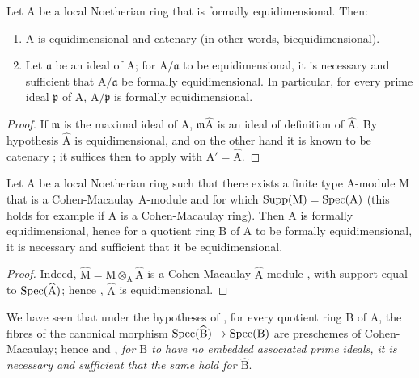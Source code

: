 \begin{corollary}[7.1.4]
\label{IV.7.1.4}
Let $\mathrm{A}$ be a local Noetherian ring that is formally equidimensional.
Then:
\begin{enumerate}[label=\emph{\roman*)}]
  \item $\mathrm{A}$ is equidimensional and catenary \textup{(in other words,} biequidimensional\textup{)}.
  \item Let $\mathfrak{a}$ be an ideal of $\mathrm{A}$; for $\mathrm{A}/\mathfrak{a}$ to be equidimensional, it is necessary and sufficient that $\mathrm{A}/\mathfrak{a}$ be formally equidimensional.
  In particular, for every prime ideal $\mathfrak{p}$ of $\mathrm{A}$, $\mathrm{A}/\mathfrak{p}$ is formally equidimensional.
\end{enumerate}
\end{corollary}

\begin{proof}
If $\mathfrak{m}$ is the maximal ideal of $\mathrm{A}$, $\mathfrak{m}\widehat{\mathrm{A}}$ is an ideal of definition of $\widehat{\mathrm{A}}$.
By hypothesis $\widehat{\mathrm{A}}$ is equidimensional, and on the other hand it is known to be catenary ; it suffices then to apply  with $\mathrm{A}'=\widehat{\mathrm{A}}$.
\end{proof}

\begin{corollary}[7.1.5]
\label{IV.7.1.5}
Let $\mathrm{A}$ be a local Noetherian ring such that there exists a finite type $\mathrm{A}$-module $\mathrm{M}$ that is a Cohen-Macaulay $\mathrm{A}$-module and for which $\operatorname{Supp}(\mathrm{M})=\operatorname{Spec}(\mathrm{A})$ \textup{(this holds for example if $\mathrm{A}$ is a Cohen-Macaulay ring)}.
Then $\mathrm{A}$ is formally equidimensional, hence  for a quotient ring $\mathrm{B}$ of $\mathrm{A}$ to be formally equidimensional, it is necessary and sufficient that it be equidimensional.
\end{corollary}

\begin{proof}
Indeed, $\widehat{\mathrm{M}}=\mathrm{M}\otimes_\mathrm{A}\widehat{\mathrm{A}}$ is a Cohen-Macaulay $\widehat{\mathrm{A}}$-module , with support equal to $\operatorname{Spec}(\widehat{\mathrm{A}})$; hence , $\widehat{\mathrm{A}}$ is equidimensional.
\end{proof}

\begin{remark}[7.1.6]
\label{IV.7.1.6}
We have seen  that under the hypotheses of , for every quotient ring $\mathrm{B}$ of $\mathrm{A}$, the fibres of the canonical morphism $\operatorname{Spec}(\widehat{\mathrm{B}})\to\operatorname{Spec}(\mathrm{B})$ are preschemes of Cohen-Macaulay; hence  and , \emph{for $\mathrm{B}$ to have no embedded associated prime ideals, it is necessary and sufficient that the same hold for $\widehat{\mathrm{B}}$}.
\end{remark}

